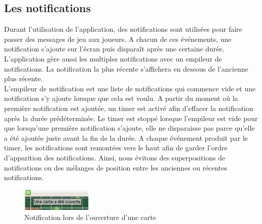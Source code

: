 \subsection{Les notifications}

Durant l'utilisation de l'application, des notifications sont utilisées pour faire passer des messages de jeu aux joueurs. A chacun de ces événements, une notification s'ajoute sur l'écran puis disparaît après une certaine durée. L'application gère aussi les multiples notifications avec un empileur de notifications. La notification la plus récente s'affichera en dessous de l'ancienne plus récente. \\

L'empileur de notification est une liste de notifications qui commence vide et une notification s'y ajoute lorsque que cela est voulu. A partir du moment où la première notification est ajoutée, un timer est activé afin d'effacer la notification après la durée prédéterminée. Le timer est stoppé lorsque l'empileur est vide pour que lorsqu'une première notification s'ajoute, elle ne disparaisse pas parce qu'elle a été ajoutée juste avant la fin de la durée. A chaque événement produit par le timer, les notifications sont remontées vers le haut afin de garder l'ordre d'apparition des notifications. Ainsi, nous évitons des superpositions de notifications ou des mélanges de position entre les anciennes ou récentes notifications.

\begin{figure}[h!]
	\centering
	\includegraphics[width=0.3\textwidth]{img/notification.png}
	\caption{Notification lors de l'ouverture d'une carte}
	\label{fig:notification}
\end{figure}